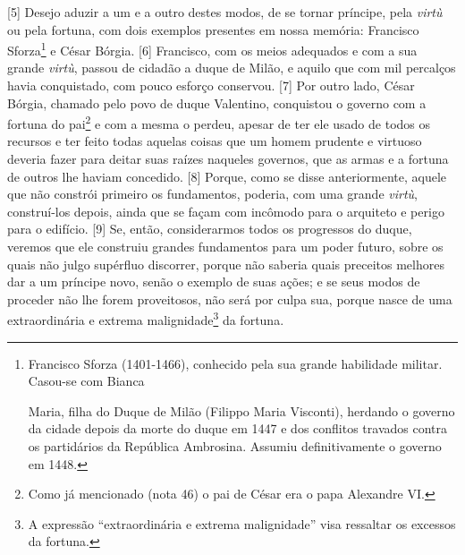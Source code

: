 {[}5{]} Desejo aduzir a um e a outro destes modos, de se tornar
príncipe, pela \emph{virtù} ou pela fortuna, com dois exemplos presentes
em nossa memória: Francisco Sforza\footnote{Francisco Sforza
  (1401-1466), conhecido pela sua grande habilidade militar. Casou-se
  com Bianca

  Maria, filha do Duque de Milão (Filippo Maria Visconti), herdando o
  governo da cidade depois da morte do duque em 1447 e dos conflitos
  travados contra os partidários da República Ambrosina. Assumiu
  definitivamente o governo em 1448.} e César Bórgia. {[}6{]} Francisco,
com os meios adequados e com a sua grande \emph{virtù}, passou de
cidadão a duque de Milão, e aquilo que com mil percalços havia
conquistado, com pouco esforço conservou. {[}7{]} Por outro lado, César
Bórgia, chamado pelo povo de duque Valentino, conquistou o governo com a
fortuna do pai\footnote{Como já mencionado (nota 46) o pai de César era
  o papa Alexandre VI.} e com a mesma o perdeu, apesar de ter ele usado
de todos os recursos e ter feito todas aquelas coisas que um homem
prudente e virtuoso deveria fazer para deitar suas raízes naqueles
governos, que as armas e a fortuna de outros lhe haviam concedido.
{[}8{]} Porque, como se disse anteriormente, aquele que não constrói
primeiro os fundamentos, poderia, com uma grande \emph{virtù},
construí-los depois, ainda que se façam com incômodo para o arquiteto e
perigo para o edifício. {[}9{]} Se, então, considerarmos todos os
progressos do duque, veremos que ele construiu grandes fundamentos para
um poder futuro, sobre os quais não julgo supérfluo discorrer, porque
não saberia quais preceitos melhores dar a um príncipe novo, senão o
exemplo de suas ações; e se seus modos de proceder não lhe forem
proveitosos, não será por culpa sua, porque nasce de uma extraordinária
e extrema malignidade\footnote{A expressão ``extraordinária e extrema
  malignidade'' visa ressaltar os excessos da fortuna.} da fortuna.

